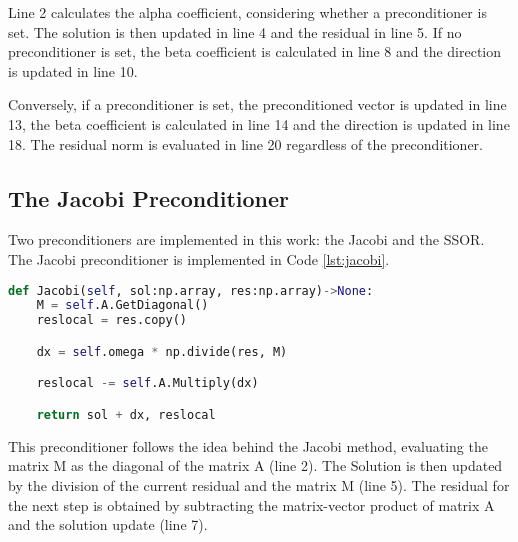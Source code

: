 Line 2 calculates the alpha coefficient, considering whether a preconditioner is set. The solution is then updated in line 4 and the residual in line 5. If no preconditioner is set, the beta coefficient is calculated in line 8 and the direction is updated in line 10. 

Conversely, if a preconditioner is set, the preconditioned vector is updated in line 13, the beta coefficient is calculated in line 14 and the direction is updated in line 18. The residual norm is evaluated in line 20 regardless of the preconditioner.

\subsection{The Jacobi Preconditioner}\label{sec:jacobi}
Two preconditioners are implemented in this work: the Jacobi and the SSOR. The Jacobi preconditioner is implemented in Code \ref{lst:jacobi}.
\begin{lstlisting}[language=python, caption={Jacobi preconditioner implementation}, label={lst:jacobi}]
def Jacobi(self, sol:np.array, res:np.array)->None:
    M = self.A.GetDiagonal()
    reslocal = res.copy()

    dx = self.omega * np.divide(res, M)

    reslocal -= self.A.Multiply(dx)

    return sol + dx, reslocal
\end{lstlisting}

This preconditioner follows the idea behind the Jacobi method, evaluating the matrix M as the diagonal of the matrix A (line 2). The Solution is then updated by the division of the current residual and the matrix M (line 5). The residual for the next step is obtained by subtracting the matrix-vector product of matrix A and the solution update (line 7).

